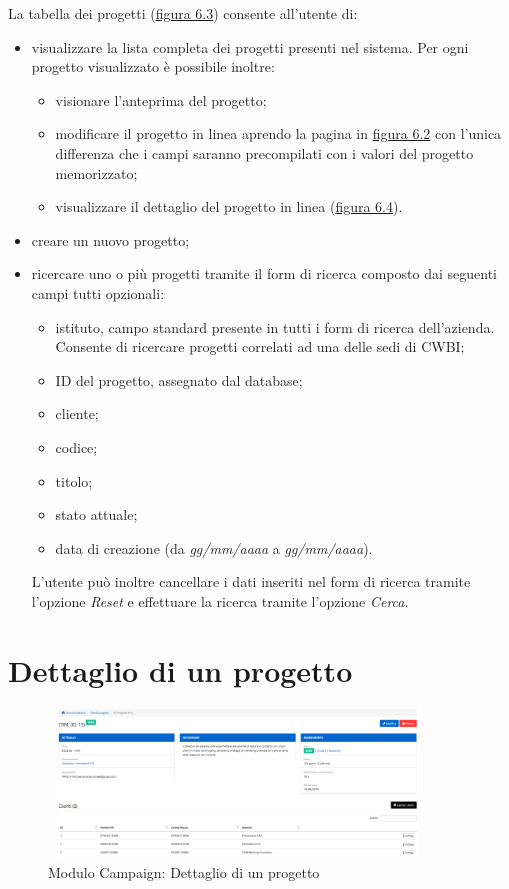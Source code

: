 \noindent La tabella dei progetti ({\hyperref[fig:tabellaProgetti]{figura 6.3}}) consente all'utente di:
\begin{itemize}
\item visualizzare la lista completa dei progetti presenti nel sistema. Per ogni progetto visualizzato è possibile inoltre: 
\begin{itemize}
\item visionare l'anteprima del progetto;
\item modificare il progetto in linea aprendo la pagina in  {\hyperref[fig:nuovoProgetto]{figura 6.2}} con l'unica differenza che i campi saranno precompilati con i valori del progetto memorizzato;
\item visualizzare il dettaglio del progetto in linea ({\hyperref[fig:dettaglioProgetto]{figura 6.4}}).
\end{itemize}

\item creare un nuovo progetto;
\item ricercare uno o più progetti tramite il form di ricerca composto dai seguenti campi tutti opzionali:
\begin{itemize}
\item istituto, campo standard presente in tutti i form di ricerca dell'azienda. Consente di ricercare progetti correlati ad una delle sedi di CWBI;
\item ID del progetto, assegnato dal database;
\item cliente;
\item codice;
\item titolo;	
\item stato attuale;
\item data di creazione (da \textit{gg/mm/aaaa} a \textit{gg/mm/aaaa}).
\end{itemize}
L'utente può inoltre cancellare i dati inseriti nel form di ricerca tramite l'opzione \textit{Reset} e effettuare la ricerca tramite l'opzione \textit{Cerca}.
\end{itemize}

\pagebreak

\section{Dettaglio di un progetto}
\begin{figure}[!h]
\centering
\includegraphics[width=380px, height=150px]{../images/UI/04-dettaglioProgetto.png}
\caption{Modulo Campaign: Dettaglio di un progetto}
\label{fig:dettaglioProgetto}
\end{figure}


